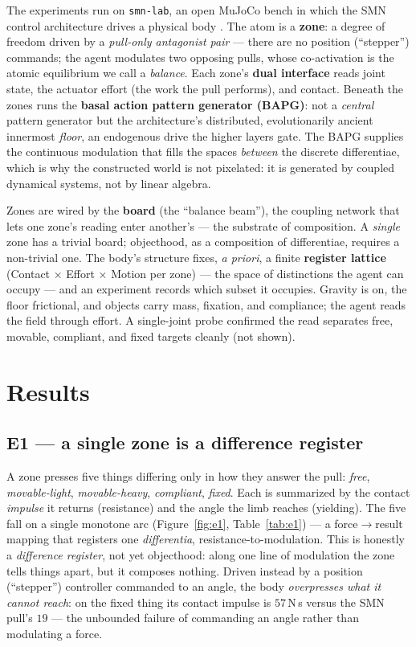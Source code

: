 \documentclass[11pt]{article}
\begin{document}
The experiments run on \texttt{smn-lab}, an open MuJoCo bench in which the SMN
control architecture drives a physical body \citep{NagarjunaKarnam2026SMN}. The
atom is a \textbf{zone}: a degree of freedom driven by a \emph{pull-only
antagonist pair} --- there are no position (``stepper'') commands; the agent
modulates two opposing pulls, whose co-activation is the atomic equilibrium we
call a \emph{balance}. Each zone's \textbf{dual interface} reads joint state, the
actuator effort (the work the pull performs), and contact. Beneath the zones runs
the \textbf{basal action pattern generator (BAPG)}: not a \emph{central} pattern
generator but the architecture's distributed, evolutionarily ancient innermost
\emph{floor}, an endogenous drive the higher layers gate. The BAPG supplies the
continuous modulation that fills the spaces \emph{between} the discrete
differentiae, which is why the constructed world is not pixelated: it is generated
by coupled dynamical systems, not by linear algebra.

Zones are wired by the \textbf{board} (the ``balance beam''), the coupling network
that lets one zone's reading enter another's --- the substrate of composition. A
\emph{single} zone has a trivial board; objecthood, as a composition of
differentiae, requires a non-trivial one. The body's structure fixes, \emph{a
priori}, a finite \textbf{register lattice} (Contact $\times$ Effort $\times$
Motion per zone) --- the space of distinctions the agent can occupy --- and an
experiment records which subset it occupies. Gravity is on, the floor frictional,
and objects carry mass, fixation, and compliance; the agent reads the field
through effort. A single-joint probe confirmed the read separates free, movable,
compliant, and fixed targets cleanly (not shown).

\section{Results}

\subsection{E1 --- a single zone is a difference register}

A zone presses five things differing only in how they answer the pull: \emph{free},
\emph{movable-light}, \emph{movable-heavy}, \emph{compliant}, \emph{fixed}. Each is
summarized by the contact \emph{impulse} it returns (resistance) and the angle the
limb reaches (yielding). The five fall on a single monotone arc
(Figure~\ref{fig:e1}, Table~\ref{tab:e1}) --- a force$\to$result mapping that
registers one \emph{differentia}, resistance-to-modulation. This is honestly a
\emph{difference register}, not yet objecthood: along one line of modulation the
zone tells things apart, but it composes nothing. Driven instead by a position
(``stepper'') controller commanded to an angle, the body \emph{overpresses what it
cannot reach}: on the fixed thing its contact impulse is $57$\,N\,s versus the SMN
pull's $19$ --- the unbounded failure of commanding an angle rather than modulating
a force.
\end{document}

